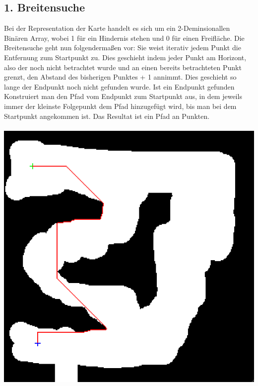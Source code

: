 \documentclass[11pt,a4paper,oneside,onecolumn]{scrartcl}
\begin{document}
\subsection*{1. Breitensuche}
	Bei der Representation der Karte handelt es sich um ein 2-Deminsionallen Binären Array, wobei 1 für ein Hindernis stehen und 0 für einen Freifläche. Die Breitensuche geht nun folgendermaßen vor: Sie weist iterativ jedem Punkt die Entfernung zum Startpunkt zu. Dies geschieht indem jeder Punkt am Horizont, also der noch nicht betrachtet wurde und an einen bereits betrachteten Punkt grenzt, den Abstand des bisherigen Punktes + 1 annimmt. Dies geschieht so lange der Endpunkt noch nicht gefunden wurde. Ist ein Endpunkt gefunden Konstruiert man den Pfad vom Endpunkt zum Startpunkt aus, in dem jeweils immer der kleinste Folgepunkt dem Pfad hinzugefügt wird, bis man bei dem Startpunkt angekommen ist. Das Resultat ist ein Pfad an Punkten.\\
	\\
	\includegraphics[scale=0.45]{p2.png} 
\end{document}
